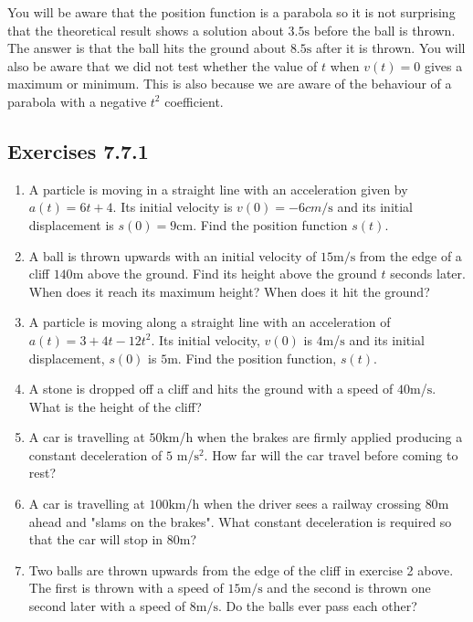 You will be aware that the position function is a parabola so it is not surprising that the theoretical
result shows a solution about $3.5 \mbox{s}$ before the ball is thrown. The
answer is that the ball hits the ground about $8.5 \mbox{s}$ after it is thrown. You will
also be aware that we did not test whether the value of $t$ when $v (t) =0$ gives a maximum or minimum. This is also because we are aware of the behaviour of
a parabola with a negative $t^{2}$ coefficient. 

\subsection{Exercises 7.7.1}
\begin{enumerate}
\item A particle is moving in a straight line with an acceleration given by $a (t) =6 t +4.$ Its initial velocity is $v (0) = -6 cm/\mbox{s}$ and its initial displacement is $s (0) =9 \mbox{cm}$. Find the position function $s (t)\text{.}$ 

\item A ball is thrown upwards with an initial velocity of $15 \mathrm{m}/\mbox{s}$ from the edge of a cliff $140 \mbox{m}$ above the ground. Find its
height above the ground $t$ seconds later. When does it reach its maximum height? When
does it hit the ground? 

\item A particle is moving along a straight line with an acceleration of $a (t) =3 +4 t -12 t^{2}$. Its initial velocity, $v (0)$ is $4 \mbox{m}$/$\mbox{s}$ and its initial displacement, $s (0)$ is $5 \mbox{m}$. Find the position function,
$s (t)$. 

\item A stone is dropped off a cliff and hits the ground with a speed of $40 \mbox{m}$/$\mbox{s}$. What is the height of the
cliff? 

\item A car is travelling at $50 \mbox{km}$/$\mbox{h}$ when the brakes are firmly applied producing a constant deceleration of
$5$ $\mbox{m}$/$\mathrm{s}^{2}$. How far will the car travel before coming to rest? 

\item A
car is travelling at $100 \mbox{km}$/$\mbox{h}$ when the driver sees a railway crossing $80 \mbox{m}$ ahead and "slams on the brakes". What
constant deceleration is required so that the car will stop in $80 \mbox{m}$? 

\item Two balls are
thrown upwards from the edge of the cliff in exercise 2 above. The first is thrown with a speed of $15 \mathrm{m}/\mbox{s}$ and the second is thrown one second later with a speed of $8 \mathrm{m}/\mbox{s}$. Do the balls ever pass each other? 


\end{enumerate}
